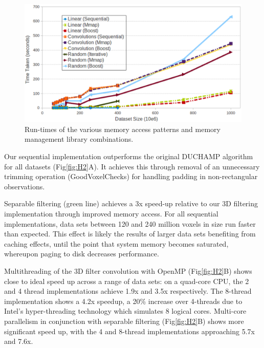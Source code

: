 \documentclass[11pt, twoside]{article}
\begin{document}
\begin{figure}[ht]
  \centering
  \includegraphics[scale=0.55]{O01_f3}
  \caption{Run-times of the various memory access patterns and  memory management library combinations.} %
  \label{fig:H3}
\end{figure}


Our sequential implementation outperforms the original DUCHAMP algorithm for all datasets (Fig\ref{fig:H2}A).  It achieves this through removal of an unnecessary  trimming operation (GoodVoxelChecks) for handling padding in non-rectangular observations.  

Separable filtering (green line) achieves a 3x speed-up relative to our 3D filtering implementation  through improved memory access. 
For all sequential implementations, data sets between  120 and 240 million voxels in size run faster than expected. This effect is likely the results of
larger data sets benefiting from caching effects, until  the point that system memory becomes saturated, whereupon paging to disk decreases performance.   %

Multithreading  of the 3D filter convolution  with OpenMP (Fig\ref{fig:H2}B) shows close to ideal speed up across a range of data sets:
on a quad-core CPU, the 2 and 4 thread implementations achieve 1.9x and 3.5x respectively.  The 8-thread implementation shows a 4.2x speedup, a 20\% increase over 4-threads due to  Intel's hyper-threading technology which simulates 8 logical cores. 
Multi-core parallelism in conjunction with separable filtering (Fig\ref{fig:H2}B) shows more significant speed up, with the 4 and 8-thread implementations approaching 5.7x and 7.6x. 
\end{document}
